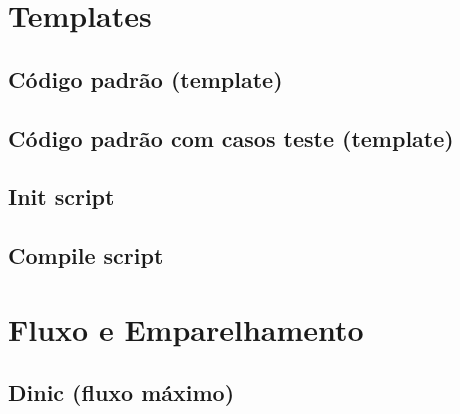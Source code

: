 \setcounter{page}{1}
\section{Templates}

\subsection{Código padrão (template)}


\subsection{Código padrão com casos teste (template)}


\subsection{Init script}


\subsection{Compile script}


\section{Fluxo e Emparelhamento}

\subsection{Dinic (fluxo máximo)}


% 

% 

% 

